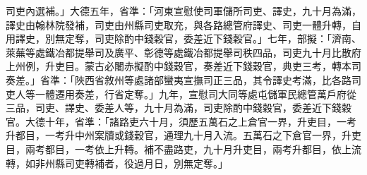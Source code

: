 \begin{pinyinscope}
司吏內選補。」大德五年，省準：「河東宣慰使司軍儲所司吏、譯史，九十月為滿，譯史由翰林院發補，司吏由州縣司吏取充，與各路總管府譯史、司吏一體升轉，自用譯史，別無定奪，司吏除酌中錢穀官，委差近下錢穀官。」七年，部擬：「濟南、萊蕪等處鐵冶都提舉司及廣平、彰德等處鐵冶都提舉司秩四品，司吏九十月比散府上州例，升吏目。蒙古必闍赤擬酌中錢穀官，奏差近下錢穀官，典吏三考，轉本司奏差。」省準：「陜西省敘州等處諸部蠻夷宣撫司正三品，其令譯史考滿，比各路司吏人等一體遷用奏差，行省定奪。」九年，宣慰司大同等處屯儲軍民總管萬戶府從三品，司吏、譯史、委差人等，九十月為滿，司吏除酌中錢穀官，委差近下錢穀官。大德十年，省準：「諸路吏六十月，須歷五萬石之上倉官一界，升吏目，一考升都目，一考升中州案牘或錢穀官，通理九十月入流。五萬石之下倉官一界，升吏目，兩考都目，一考依上升轉。補不盡路吏，九十月升吏目，兩考升都目，依上流轉，如非州縣司吏轉補者，役過月日，別無定奪。」




\end{pinyinscope}
